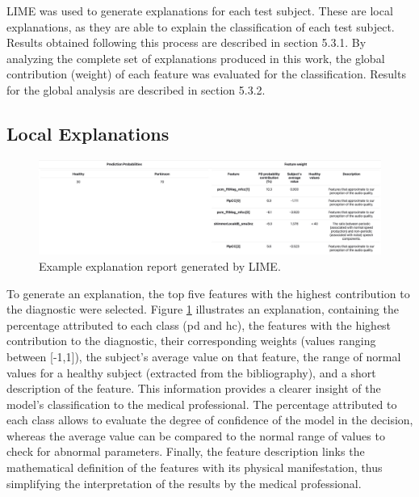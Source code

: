 LIME was used to generate explanations for each test subject. These are local explanations, as they are able to explain the classification of each test subject. Results obtained following this process are described in section 5.3.1. By analyzing the complete set of explanations produced in this work, the global contribution (weight) of each feature was evaluated for the classification. Results for the global analysis are described in section 5.3.2.

\subsection{Local Explanations}

\begin{figure}[t]
	\begin{center}
		\includegraphics[clip=true, width=\textwidth]{figs/example_explanation.jpg}
	\end{center}
	\caption{Example explanation report generated by LIME.}
	\label{explanation}
\end{figure}

To generate an explanation, the top five features with the highest contribution to the diagnostic were selected. Figure \ref{explanation} illustrates an explanation, containing the percentage attributed to each class (\gls{pd} and \gls{hc}), the features with the highest contribution to the diagnostic, their corresponding weights (values ranging between [-1,1]), the subject's average value on that feature, the range of normal values for a healthy subject (extracted from the bibliography), and a short description of the feature. This information provides a clearer insight of the model's classification to the medical professional. The percentage attributed to each class allows to evaluate the degree of confidence of the model in the decision, whereas the average value can be compared to the normal range of values to check for abnormal parameters. Finally, the feature description links the mathematical definition of the features with its physical manifestation, thus simplifying the interpretation of the results by the medical professional. 

